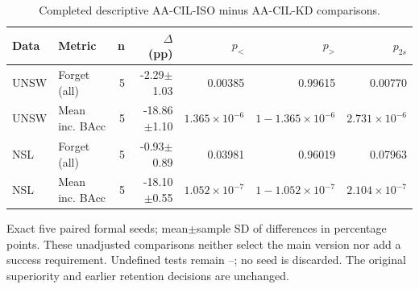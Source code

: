 \begin{table}[t]
\centering\scriptsize
\setlength{\tabcolsep}{3.8pt}
\caption{Completed descriptive AA-CIL-ISO minus AA-CIL-KD comparisons.}\label{tab:retention-iso-kd}
\begin{tabular}{llrrrrr}
\toprule
Data & Metric & n & $\Delta$ (pp) & $p_{<}$ & $p_{>}$ & $p_{2s}$ \\
\midrule
UNSW & Forget (all) & 5 & -2.29$\pm$1.03 & 0.00385 & 0.99615 & 0.00770 \\
UNSW & Mean inc. BAcc & 5 & -18.86$\pm$1.10 & $1.365\times10^{-6}$ & $1-1.365\times10^{-6}$ & $2.731\times10^{-6}$ \\
NSL & Forget (all) & 5 & -0.93$\pm$0.89 & 0.03981 & 0.96019 & 0.07963 \\
NSL & Mean inc. BAcc & 5 & -18.10$\pm$0.55 & $1.052\times10^{-7}$ & $1-1.052\times10^{-7}$ & $2.104\times10^{-7}$ \\
\bottomrule
\end{tabular}
\par\vspace{2pt}\begin{minipage}{.98\linewidth}\footnotesize Exact five paired formal seeds; mean$\pm$sample SD of differences in percentage points. These unadjusted comparisons neither select the main version nor add a success requirement. Undefined tests remain --; no seed is discarded. The original superiority and earlier retention decisions are unchanged.\end{minipage}
\end{table}
